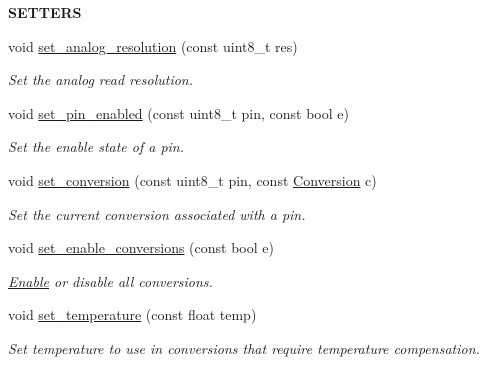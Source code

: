 \begin{Indent}{\bf S\+E\+T\+T\+E\+RS}\par
\begin{DoxyCompactItemize}
\item 
void \hyperlink{class_loom___analog_a5a513390535fd71e06df243a964bab84}{set\+\_\+analog\+\_\+resolution} (const uint8\+\_\+t res)
\begin{DoxyCompactList}\small\item\em Set the analog read resolution. \end{DoxyCompactList}\item 
void \hyperlink{class_loom___analog_a0b6e9a100feed45e710aa05fac607147}{set\+\_\+pin\+\_\+enabled} (const uint8\+\_\+t pin, const bool e)
\begin{DoxyCompactList}\small\item\em Set the enable state of a pin. \end{DoxyCompactList}\item 
void \hyperlink{class_loom___analog_ad0cd72042cd7a978c7c1fc6761c38cf8}{set\+\_\+conversion} (const uint8\+\_\+t pin, const \hyperlink{class_loom___analog_a83079adfd115a272351323429cefad46}{Conversion} c)
\begin{DoxyCompactList}\small\item\em Set the current conversion associated with a pin. \end{DoxyCompactList}\item 
void \hyperlink{class_loom___analog_a80761be7bed4d3ae55eb4b9faa26a58c}{set\+\_\+enable\+\_\+conversions} (const bool e)
\begin{DoxyCompactList}\small\item\em \hyperlink{namespace_enable}{Enable} or disable all conversions. \end{DoxyCompactList}\item 
void \hyperlink{class_loom___analog_af7a82f3654bf08974ff95dd8ec90dba7}{set\+\_\+temperature} (const float temp)
\begin{DoxyCompactList}\small\item\em Set temperature to use in conversions that require temperature compensation. \end{DoxyCompactList}\end{DoxyCompactItemize}
\end{Indent}

